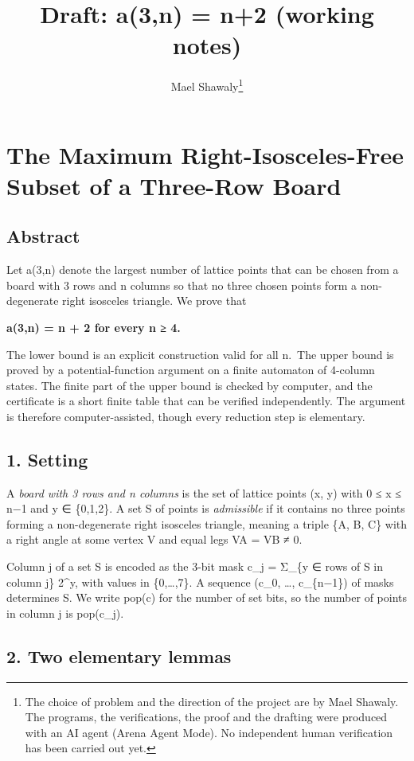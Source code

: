 \documentclass[
  11pt,
]{article}
\title{Draft: a(3,n) = n+2 (working notes)}
\author{Mael Shawaly\thanks{The choice of problem and the direction of the project are by Mael Shawaly. The programs, the verifications, the proof and the drafting were produced with an AI agent (Arena Agent Mode). No independent human verification has been carried out yet.}}
\date{}
\begin{document}
\maketitle

\section{The Maximum Right-Isosceles-Free Subset of a Three-Row
Board}\label{the-maximum-right-isosceles-free-subset-of-a-three-row-board}

\subsection{Abstract}\label{abstract}

Let a(3,n) denote the largest number of lattice points that can be
chosen from a board with 3 rows and n columns so that no three chosen
points form a non-degenerate right isosceles triangle. We prove that

\textbf{a(3,n) = n + 2 for every n ≥ 4.}

The lower bound is an explicit construction valid for all n.~The upper
bound is proved by a potential-function argument on a finite automaton
of 4-column states. The finite part of the upper bound is checked by
computer, and the certificate is a short finite table that can be
verified independently. The argument is therefore computer-assisted,
though every reduction step is elementary.

\subsection{1. Setting}\label{setting}

A \emph{board with 3 rows and n columns} is the set of lattice points
(x, y) with 0 ≤ x ≤ n−1 and y ∈ \{0,1,2\}. A set S of points is
\emph{admissible} if it contains no three points forming a
non-degenerate right isosceles triangle, meaning a triple \{A, B, C\}
with a right angle at some vertex V and equal legs VA = VB ≠ 0.

Column j of a set S is encoded as the 3-bit mask c\_j = Σ\_\{y ∈ rows of
S in column j\} 2\^{}y, with values in \{0,\ldots,7\}. A sequence (c\_0,
\ldots, c\_\{n−1\}) of masks determines S. We write pop(c) for the
number of set bits, so the number of points in column j is pop(c\_j).

\subsection{2. Two elementary lemmas}\label{two-elementary-lemmas}
\end{document}
